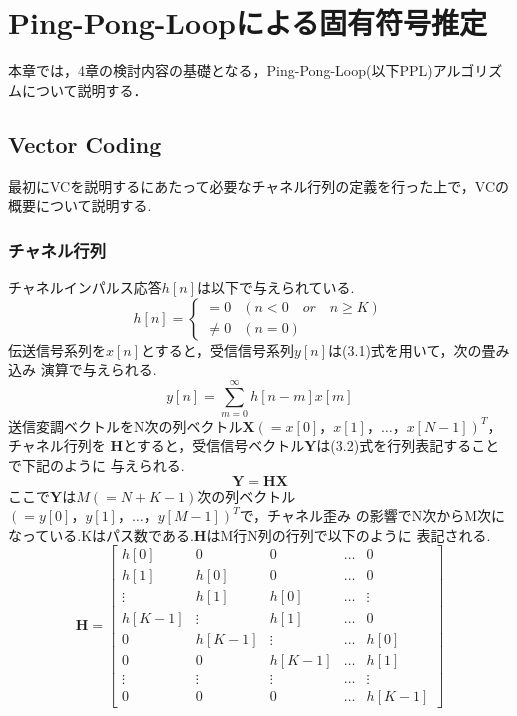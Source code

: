 \chapter{Ping-Pong-Loopによる固有符号推定}
本章では，4章の検討内容の基礎となる，Ping-Pong-Loop(以下PPL)アルゴリズムについて説明する．

\section{Vector Coding}
最初にVCを説明するにあたって必要なチャネル行列の定義を行った上で，VCの概要について説明する.

\subsection{チャネル行列}
チャネルインパルス応答$h[n]$は以下で与えられている.
\begin{equation}
    h[n] = \left\{
        \begin{array}{ll}
            = 0 & (n<0 \quad or \quad n \geq K) \\
            \neq 0 & (n=0)
        \end{array}
    \right.
\end{equation}
伝送信号系列を$x[n]$とすると，受信信号系列$y[n]$は(3.1)式を用いて，次の畳み込み
演算で与えられる.
\begin{equation}
    y[n] = \sum_{m=0}^\infty h[n-m]x[m]
\end{equation}
送信変調ベクトルをN次の列ベクトル$\bm{X}(=x[0]，x[1]，\ldots，x[N-1])^T$，チャネル行列を
$\bm{H}$とすると，受信信号ベクトル$\bm{Y}$は(3.2)式を行列表記することで下記のように
与えられる.
\begin{equation}
    \bm{Y} = \bm{HX}
\end{equation}
ここで$\bm{Y}$は$M(=N+K-1)$次の列ベクトル$(=y[0]，y[1]，\ldots，y[M-1])^T$で，チャネル歪み
の影響でN次からM次になっている.Kはパス数である.$\bm{H}$はM行N列の行列で以下のように
表記される.
\begin{equation}
    \bm{H} = \left[
        \begin{array}{ccccc}
            h[0] & 0 & 0 & \ldots & 0 \\
            h[1] & h[0] & 0 & \ldots & 0 \\
            \vdots & h[1] & h[0] & \ldots & \vdots \\
            h[K-1] & \vdots & h[1] & \ldots & 0 \\
            0 & h[K-1] & \vdots & \ldots & h[0] \\
            0 & 0 & h[K-1] & \ldots & h[1] \\
            \vdots & \vdots & \vdots & \ldots & \vdots \\
            0 & 0 & 0 & \ldots & h[K-1]
        \end{array}
    \right]
\end{equation}

